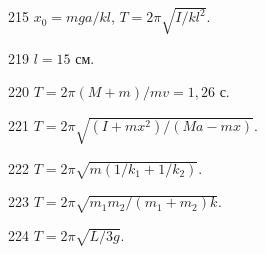 \begin{Answer}{215}
$x_0 = mga/kl$, $T = 2 \pi \sqrt{I/kl^2}$.
\end{Answer}
\begin{Answer}{219}
$l = 15$ см.
\end{Answer}
\begin{Answer}{220}
$T = 2 \pi (M+m) / mv = 1,26$ с.
\end{Answer}
\begin{Answer}{221}
$T = 2 \pi \sqrt{(I+mx^2)/(Ma - mx)}$.
\end{Answer}
\begin{Answer}{222}
$T = 2 \pi \sqrt{m(1/k_1 + 1/k_2)}$.
\end{Answer}
\begin{Answer}{223}
$T = 2 \pi \sqrt{m_1m_2/(m_1 + m_2)k}$.
\end{Answer}
\begin{Answer}{224}
$T = 2 \pi \sqrt{L/3g}$.
\end{Answer}
